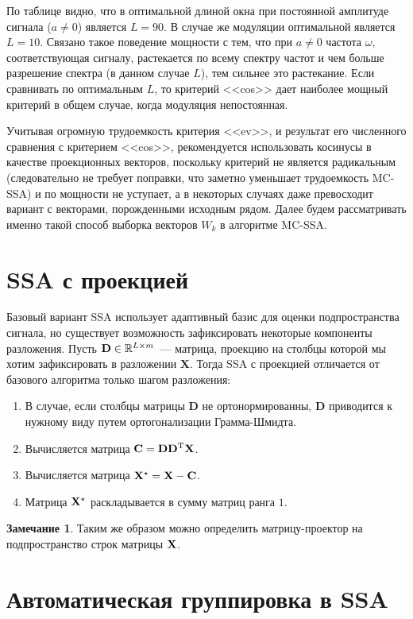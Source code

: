 \documentclass[specialist,
substylefile = spbu_report.rtx,
subf,href,colorlinks=true, 12pt]{disser}
\theoremstyle{definition}
\newtheorem{remark}{Замечание}[chapter]
\begin{document}
По таблице видно, что в оптимальной длиной окна при постоянной амплитуде сигнала ($a\ne0$) является $L=90$. В случае же модуляции оптимальной является $L=10$. Связано такое поведение мощности с тем, что при $a\ne0$ частота $\omega$, соответствующая сигналу, растекается по всему спектру частот и чем больше разрешение спектра (в данном случае $L$), тем сильнее это растекание. Если сравнивать по оптимальным $L$, то критерий <<cos>> дает наиболее мощный критерий в общем случае, когда модуляция непостоянная.

Учитывая огромную трудоемкость критерия <<ev>>, и результат его численного сравнения с критерием <<cos>>, рекомендуется использовать косинусы в качестве проекционных векторов, поскольку критерий не является радикальным (следовательно не требует поправки, что заметно уменьшает трудоемкость MC-SSA) и по мощности не уступает, а в некоторых случаях даже превосходит вариант с векторами, порожденными исходным рядом. Далее будем рассматривать именно такой способ выборка векторов $W_k$ в алгоритме MC-SSA.

\section{SSA с проекцией}

Базовый вариант SSA использует адаптивный базис для оценки подпространства сигнала, но существует возможность зафиксировать некоторые компоненты разложения. Пусть $\mathbf{D}\in\mathbb{R}^{L\times m}$~--- матрица, проекцию на столбцы которой мы хотим зафиксировать в разложении $\mathbf{X}$. Тогда SSA с проекцией отличается от базового алгоритма только шагом разложения:
\begin{enumerate}
	\item В случае, если столбцы матрицы $\mathbf{D}$ не ортонормированны, $\mathbf{D}$ приводится к нужному виду путем ортогонализации Грамма-Шмидта.
	\item Вычисляется матрица $\mathbf{C}=\mathbf{D}\mathbf{D}^{\mathrm{T}}\mathbf{X}$.
	\item Вычисляется матрица $\mathbf{X}^\star=\mathbf{X}-\mathbf{C}$.
	\item Матрица $\mathbf{X}^\star$ раскладывается в сумму матриц ранга $1$.
\end{enumerate}

\begin{remark}
	Таким же образом можно определить матрицу-проектор на подпространство строк матрицы $\mathbf{X}$.
\end{remark}

\section{Автоматическая группировка в SSA}\label{sect:grouping_auto}
\end{document}
